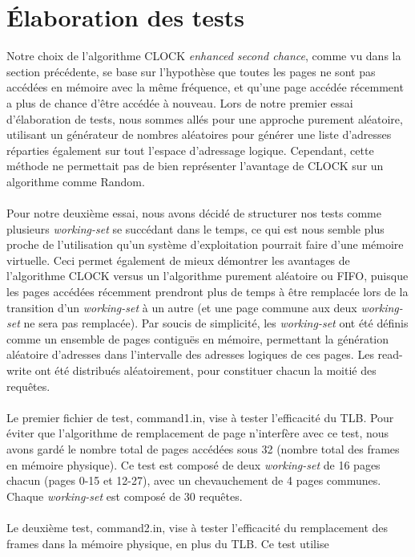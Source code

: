 \documentclass{article}
\begin{document}
\section{Élaboration des tests}
\setlength{\parindent}{20pt}
Notre choix de l’algorithme CLOCK \emph{enhanced second chance}, comme vu dans la section précédente, se base sur l’hypothèse que toutes les 
pages ne sont pas accédées en mémoire avec la même fréquence, et qu’une page accédée récemment a plus de chance d’être accédée à nouveau. 
Lors de notre premier essai d’élaboration de tests, nous sommes allés pour une approche purement aléatoire, utilisant un générateur de nombres 
aléatoires pour générer une liste d’adresses réparties également sur tout l’espace d’adressage logique. Cependant, cette méthode ne permettait  
pas de bien représenter l’avantage de CLOCK sur un algorithme comme Random.\\
\\
Pour notre deuxième essai, nous avons décidé de structurer nos tests comme plusieurs \emph{working-set} se succédant dans le temps, ce qui est 
nous semble plus proche de l’utilisation qu’un système d’exploitation pourrait faire d’une mémoire virtuelle. Ceci permet également de mieux 
démontrer les avantages de l’algorithme CLOCK versus un l’algorithme purement aléatoire ou FIFO, puisque les pages accédées récemment prendront 
plus de temps à être remplacée lors de la transition d’un \emph{working-set} à un autre (et une page commune aux deux \emph{working-set} ne sera 
pas remplacée). Par soucis de simplicité, les \emph{working-set} ont été définis comme un ensemble de pages contiguës en mémoire, permettant la 
génération aléatoire d’adresses dans l’intervalle des adresses logiques de ces pages. Les read-write ont été distribués aléatoirement, pour 
constituer chacun la moitié des requêtes.\\    
\\
Le premier fichier de test, command1.in, vise à tester l’efficacité du TLB. Pour éviter que l’algorithme de remplacement de page n’interfère 
avec ce test, nous avons gardé le nombre total de pages accédées sous 32 (nombre total des frames en mémoire physique). Ce test est composé de 
deux \emph{working-set} de 16 pages chacun (pages 0-15 et 12-27), avec un chevauchement de 4 pages communes. Chaque \emph{working-set} est 
composé de 30 requêtes.\\ 
\\
Le deuxième test, command2.in, vise à tester l’efficacité du remplacement des frames dans la mémoire physique, en plus du TLB. Ce test utilise 
\end{document}
